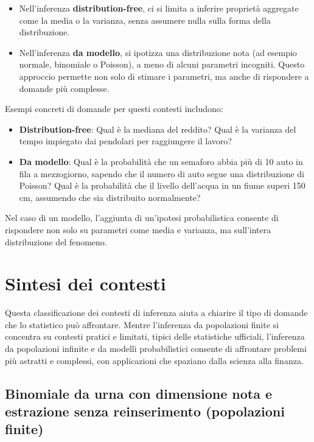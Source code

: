 \documentclass[
  11pt,
]{book}
\providecommand{\tightlist}{%
  \setlength{\itemsep}{0pt}\setlength{\parskip}{0pt}}
\theoremstyle{mytheoremstyle}
\theoremstyle{mydefstyle}
\begin{document}
\begin{itemize}
\tightlist
\item
  Nell'inferenza \textbf{distribution-free}, ci si limita a inferire proprietà aggregate come la media o la varianza, senza assumere nulla sulla forma della distribuzione.
\item
  Nell'inferenza \textbf{da modello}, si ipotizza una distribuzione nota (ad esempio normale, binomiale o Poisson), a meno di alcuni parametri incogniti. Questo approccio permette non solo di stimare i parametri, ma anche di rispondere a domande più complesse.
\end{itemize}

Esempi concreti di domande per questi contesti includono:

\begin{itemize}
\tightlist
\item
  \textbf{Distribution-free}: Qual è la mediana del reddito? Qual è la varianza del tempo impiegato dai pendolari per raggiungere il lavoro?
\item
  \textbf{Da modello}: Qual è la probabilità che un semaforo abbia più di 10 auto in fila a mezzogiorno, sapendo che il numero di auto segue una distribuzione di Poisson? Qual è la probabilità che il livello dell'acqua in un fiume superi 150 cm, assumendo che sia distribuito normalmente?
\end{itemize}

Nel caso di un modello, l'aggiunta di un'ipotesi probabilistica consente di rispondere non solo su parametri come media e varianza, ma sull'intera distribuzione del fenomeno.

\section{Sintesi dei contesti}\label{sintesi-dei-contesti}

Questa classificazione dei contesti di inferenza aiuta a chiarire il tipo di domande che lo statistico può affrontare. Mentre l'inferenza da popolazioni finite si concentra su contesti pratici e limitati, tipici delle statistiche ufficiali, l'inferenza da popolazioni infinite e da modelli probabilistici consente di affrontare problemi più astratti e complessi, con applicazioni che spaziano dalla scienza alla finanza.

\subsection{Binomiale da urna con dimensione nota e estrazione senza reinserimento (popolazioni finite)}\label{binomiale-da-urna-con-dimensione-nota-e-estrazione-senza-reinserimento-popolazioni-finite}
\end{document}
